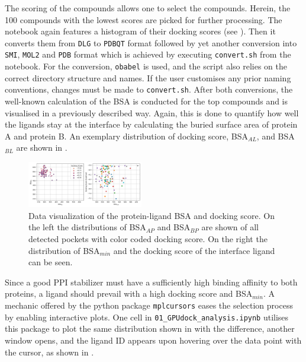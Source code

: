 \documentclass[9pt,tutorial]{livecoms}
\newcommand{\code}[1]{\colorbox{light-gray}{\texttt{#1}}}
\begin{document}
The scoring of the compounds allows one to select the compounds. Herein, the 100 compounds with the lowest scores are picked for further processing. The notebook again features a histogram of their docking scores (see ). Then it converts them from \texttt{DLG} to \texttt{PDBQT} format followed by yet another conversion into \texttt{SMI}, \texttt{MOL2} and \texttt{PDB} format which is achieved by executing \code{convert.sh} from the notebook. For the conversion, \code{obabel} is used, and the script also relies on the correct directory structure and names. If the user customises any prior naming conventions, changes must be made to \code{convert.sh}. After both conversions, the well-known calculation of the BSA is conducted for the top compounds and is visualised in a previously described way. Again, this is done to quantify how well the ligands stay at the interface by calculating the buried surface area of protein A and protein B. An exemplary distribution of docking score, BSA$_{AL}$, and BSA$_{BL}$ are shown in .

\begin{figure}[H]
\centering
\includegraphics[width=0.45\textwidth]{figures/BSA_dockingscore_GPU.jpeg}
\caption{Data visualization of the protein-ligand BSA and docking score. On the left the distributions of BSA$_{AP}$ and BSA$_{BP}$ are shown of all detected pockets with color coded docking score. On the right the distribution of BSA$_{min}$ and the docking score of the interface ligand can be seen.}
\label{fig:BSA_dockingscore_GPU}
\end{figure}

Since a good PPI stabilizer must have a sufficiently high binding affinity to both proteins, a ligand should prevail with a high docking score and BSA$_{min}$. A mechanic offered by the python package \code{mplcursors} eases the selection process by enabling interactive plots. One cell in \code{01\_GPUdock\_analysis.ipynb} utilises this package to plot the same distribution shown in  with the difference, another window opens, and the ligand ID appears upon hovering over the data point with the cursor, as shown in . 
\end{document}
